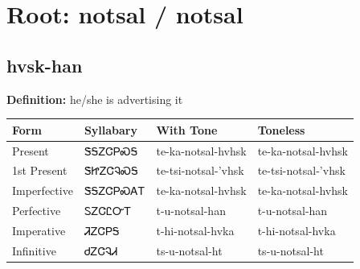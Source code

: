 \documentclass{article}%
\begin{document}
%
\normalsize%
\section*{Root: notsal / notsal}%
\subsection*{hvsk-han}%
\textbf{Definition: }%
he/she is advertising it%
\\[0.5em]%
\begin{tabular}{|l|l|l|l|}%
\hline%
\textbf{Form}&\textbf{Syllabary}&\textbf{With Tone}&\textbf{Toneless}\\%
\hline%
Present&ᏕᎦᏃᏣᏢᏍᎦ&te{-}ka{-}notsal{-}hvhsk&te{-}ka{-}notsal{-}hvhsk\\%
1st Present&ᏕᏥᏃᏣᎸᏍᎦ&te{-}tsi{-}notsal{-}'vhsk&te{-}tsi{-}notsal{-}'vhsk\\%
Imperfective&ᏕᎦᏃᏣᏢᏍᎪᎢ&te{-}ka{-}notsal{-}hvhsk&te{-}ka{-}notsal{-}hvhsk\\%
Perfective&ᏚᏃᏣᏝᏅᎢ&t{-}u{-}notsal{-}han&t{-}u{-}notsal{-}han\\%
Imperative&ᏘᏃᏣᏢᎦ&t{-}hi{-}notsal{-}hvka&t{-}hi{-}notsal{-}hvka\\%
Infinitive&ᏧᏃᏣᎸᏗ&ts{-}u{-}notsal{-}ht&ts{-}u{-}notsal{-}ht\\%
\hline%
\end{tabular}%
\\[1em]%
\end{document}
